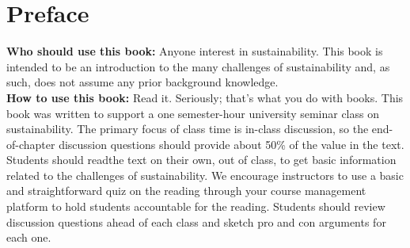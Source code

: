 \clearpage
 
 
 
 
\blankpage

{
\chapter*{Preface}
\thispagestyle{plain}

\noindent
\textbf{Who should use this book:} Anyone interest in sustainability. 
This book is intended to be an introduction to the many challenges of 
sustainability and, as such, does not assume any prior background knowledge. \\

\textbf{How to use this book:} Read it. Seriously; that's what you do with books.
This book was written to support a one semester-hour university seminar class
on sustainability. The primary focus of class time is in-class discussion, so 
the end-of-chapter discussion questions should provide about 50\% of the value
in the text. Students should readthe text on their own, out of class, to get 
basic information related to  the challenges of sustainability. We encourage 
instructors to use a basic and straightforward quiz on the reading through your 
course management platform to hold students accountable for the reading. 
Students should review discussion questions ahead of each class and sketch 
pro and con arguments for each one. \\

}
